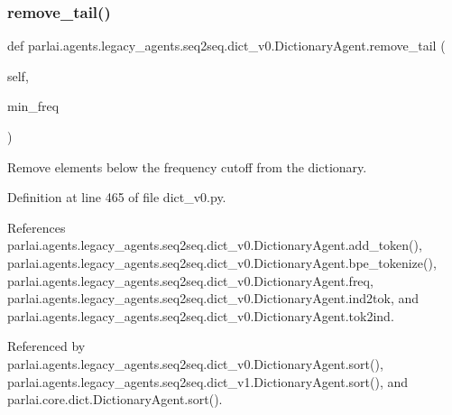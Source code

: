 \subsubsection{\texorpdfstring{remove\+\_\+tail()}{remove\_tail()}}
{\footnotesize\ttfamily def parlai.\+agents.\+legacy\+\_\+agents.\+seq2seq.\+dict\+\_\+v0.\+Dictionary\+Agent.\+remove\+\_\+tail (\begin{DoxyParamCaption}\item[{}]{self,  }\item[{}]{min\+\_\+freq }\end{DoxyParamCaption})}

\begin{DoxyVerb}Remove elements below the frequency cutoff from the dictionary.\end{DoxyVerb}
 

Definition at line 465 of file dict\+\_\+v0.\+py.



References parlai.\+agents.\+legacy\+\_\+agents.\+seq2seq.\+dict\+\_\+v0.\+Dictionary\+Agent.\+add\+\_\+token(), parlai.\+agents.\+legacy\+\_\+agents.\+seq2seq.\+dict\+\_\+v0.\+Dictionary\+Agent.\+bpe\+\_\+tokenize(), parlai.\+agents.\+legacy\+\_\+agents.\+seq2seq.\+dict\+\_\+v0.\+Dictionary\+Agent.\+freq, parlai.\+agents.\+legacy\+\_\+agents.\+seq2seq.\+dict\+\_\+v0.\+Dictionary\+Agent.\+ind2tok, and parlai.\+agents.\+legacy\+\_\+agents.\+seq2seq.\+dict\+\_\+v0.\+Dictionary\+Agent.\+tok2ind.



Referenced by parlai.\+agents.\+legacy\+\_\+agents.\+seq2seq.\+dict\+\_\+v0.\+Dictionary\+Agent.\+sort(), parlai.\+agents.\+legacy\+\_\+agents.\+seq2seq.\+dict\+\_\+v1.\+Dictionary\+Agent.\+sort(), and parlai.\+core.\+dict.\+Dictionary\+Agent.\+sort().

